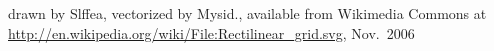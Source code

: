 drawn by Slffea, vectorized by Mysid., available from Wikimedia Commons at \url{http://en.wikipedia.org/wiki/File:Rectilinear_grid.svg}, Nov.\ 2006%
